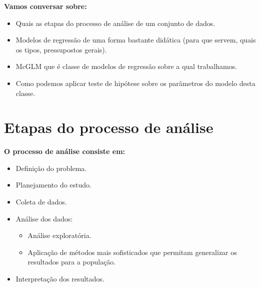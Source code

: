 \documentclass[10pt,
  aspectratio=169,
  serif,
  mathserif,
  professionalfont,
  compress,
  handout,
  ]{beamer}\usepackage[]{graphicx}\usepackage[]{color}
\begin{document}
\begin{frame}[c, allowframebreaks]
  
  \textbf{Vamos conversar sobre:}
  
  \begin{itemize}

  \item Quais as etapas do processo de análise de um conjunto de dados.
  
  \item Modelos de regressão de uma forma bastante didática (para que servem, quais os tipos, pressupostos gerais).
  
  \item McGLM que é classe de modelos de regressão sobre a qual trabalhamos.
  
  \item Como podemos aplicar teste de hipótese sobre os parâmetros do modelo desta classe.
  
  \end{itemize}

\end{frame}


\section{Etapas do processo de análise}

\begin{frame}[c, allowframebreaks]

\textbf{O processo de análise consiste em:}

  \begin{itemize}

  \item Definição do problema.

  \item Planejamento do estudo.

  \item Coleta de dados.

  \item Análise dos dados:
    \begin{itemize}
      \item Análise exploratória.
      \item Aplicação de métodos mais sofisticados que permitam generalizar os resultados para a população.
    \end{itemize}

  \item Interpretação dos resultados.
  
  \end{itemize}

\end{frame}
\end{document}
